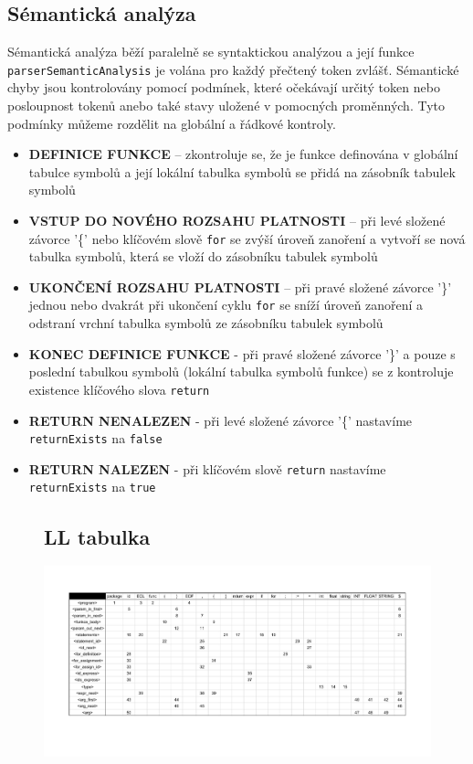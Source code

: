 \documentclass[a4paper, 12pt]{article}
\def\fillandplacepagenumber{%
 \par\pagestyle{empty}%
 \vbox to 0pt{\vss}\vfill
 \vbox to 0pt{\baselineskip0pt
   \hbox to\linewidth{\hss}%
   \baselineskip\footskip
   \hbox to\linewidth{%
     \hfil\thepage\hfil}\vss}}
\begin{document}
\subsection{Sémantická analýza}
Sémantická analýza běží paralelně se syntaktickou analýzou a její funkce \verb|parserSemanticAnalysis| je volána pro každý přečtený token zvlášť. Sémantické chyby jsou kontrolovány pomocí podmínek, které očekávají určitý token nebo posloupnost tokenů anebo také stavy uložené v pomocných proměnných. Tyto podmínky můžeme rozdělit na globální a řádkové kontroly.
\begin{itemize}
    \item \textbf{DEFINICE FUNKCE} – zkontroluje se, že je funkce definována v globální tabulce symbolů a její lokální tabulka symbolů se přidá na zásobník tabulek symbolů
    \item \textbf{VSTUP DO NOVÉHO ROZSAHU PLATNOSTI} – při levé složené závorce '\{' nebo klíčovém slově \verb|for| se zvýší úroveň zanoření a vytvoří se nová tabulka symbolů, která se vloží do zásobníku tabulek symbolů
    \item \textbf{UKONČENÍ ROZSAHU PLATNOSTI} – při pravé složené závorce '\}' jednou nebo dvakrát při ukončení cyklu \verb|for| se sníží úroveň zanoření a odstraní vrchní tabulka symbolů ze zásobníku tabulek symbolů
    \item \textbf{KONEC DEFINICE FUNKCE} - při pravé složené závorce '\}' a pouze s poslední tabulkou symbolů (lokální tabulka symbolů funkce) se z kontroluje existence klíčového slova \verb|return|
    \item \textbf{RETURN NENALEZEN} - při levé složené závorce '\{' nastavíme \verb|returnExists| na \verb|false|
    \item \textbf{RETURN NALEZEN} - při klíčovém slově \verb|return| nastavíme \verb|returnExists| na \verb|true|
\end{itemize}


\begin{landscape}
\pagestyle{empty}
\begin{figure}[h]
\subsection{LL tabulka}
\hspace*{-3.6cm}\vspace*{+1cm}\includegraphics[width=1.85\textwidth,keepaspectratio]{LL_table.pdf}
\end{figure}
\end{landscape}
\end{document}
